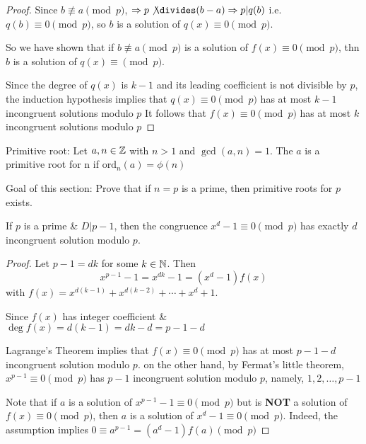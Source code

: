 \begin{proof}
    Since $b \not\equiv a \pmod p$, $\Rightarrow p \not \divides  (b-a) \Rightarrow p | q(b)$
    i.e. $q(b) \equiv 0 \pmod p$, so $b$ is a solution of $q(x) \equiv 0 \pmod p$.

    So we have shown that if $b \not\equiv a \pmod p$ is a solution of $f(x) \equiv 0 \pmod p$,
    thn $b$ is a solution of $q(x) \equiv \pmod p$.

    Since the degree of $q(x)$ is $k-1$ and its leading coefficient is not divisible by $p$, the induction hypothesis
    implies that $q(x) \equiv 0 \pmod p$ has at most 
    $k-1$ incongruent solutions modulo $p$ It follows that $f(x) \equiv 0 \pmod p$ has at most $k$ incongruent solutions modulo $p$
\end{proof}

Primitive root:
Let $a, n \in \mathbb{Z}$ with $n > 1$ and $\gcd(a, n) = 1$. The 
$a$ is a primitive root for n if $\text{ord}_n(a) = \phi(n)$

Goal of this section: 
Prove that if $n = p$ is a prime, then primitive roots for $p$ exists.

\begin{corollary}
    If $p$ is a prime \& $D|p-1$, then the congruence $x^d - 1 \equiv 0 \pmod p$ has exactly $d$
    incongruent solution modulo $p$.
\end{corollary}
\begin{proof}
    Let $p - 1 = dk$ for some $k \in \mathbb{N}$.
    Then
    \[
        x^{p-1}-1 = x^{dk}-1 = (x^d - 1)f(x)
    \]
    with $f(x) = x^{d(k-1)} + x^{d(k-2)} + \cdots + x^d + 1$.

    Since $f(x)$ has integer coefficient \& $\deg f(x) = d(k-1) = dk-d = p-1-d$

    Lagrange's Theorem implies that $f(x) \equiv 0 \pmod p$ has at most $p-1-d$ incongruent solution modulo $p$.
    on the other hand, by Fermat's little theorem, $x^{p-1} \equiv 0 \pmod p$ has $p-1$ incongruent solution modulo $p$, namely, $1, 2, \dots, p-1$

    Note that if $a$ is a solution of $x^{p-1}-1 \equiv 0 \pmod p$ but is \textbf{NOT} a solution of $f(x) \equiv 0 \pmod p$,
    then $a$ is a solution of $x^d-1 \equiv 0 \pmod p$. 
    Indeed, the assumption implies $0 \equiv a^{p-1} = (a^d - 1)f(a) \pmod p$

    
\end{proof}


